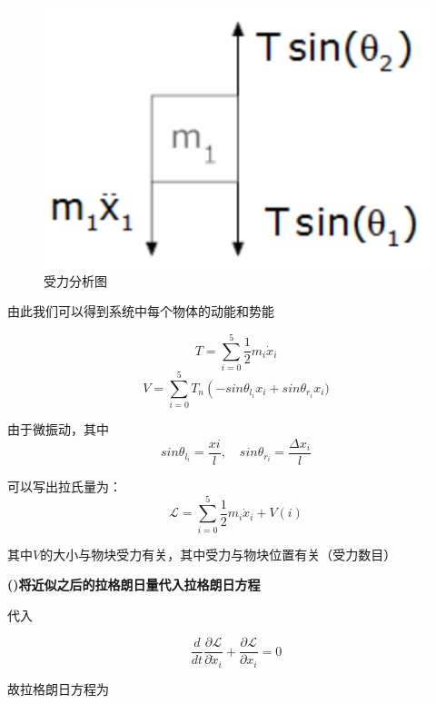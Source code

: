 \documentclass[11pt, a4paper, oneside]{ctexart}
\begin{document}
{\begin{figure}[h]
    \centering
    \vspace{4mm}
    \includegraphics[scale=0.2]{44.png}
    \caption{受力分析图}
\end{figure} 

由此我们可以得到系统中每个物体的动能和势能

\begin{equation}
    T = \sum_{i=0}^5\frac{1}{2}m_i\dot{x}_i
\end{equation}
\begin{equation}
    V = \sum_{i=0}^5T_n\left(-sin\theta_{l_i}x_i+sin\theta_{r_i}x_i\right.)
\end{equation}

由于微振动，其中
\begin{equation}
    sin\theta_{l_i}=\frac{xi}{l},\quad sin\theta_{r_i}=\frac{\Delta x_i}{l}
\end{equation}

可以写出拉氏量为：
\begin{equation}
    \mathscr{L}=\sum_{i=0}^5\frac{1}{2}m_i\dot{x}_i+V(i)
\end{equation}

其中$V$的大小与物块受力有关，其中受力与物块位置有关（受力数目）

\vspace{5mm}
\textbf{()将近似之后的拉格朗日量代入拉格朗日方程}

\vspace{5mm}代入

\begin{equation}
    \frac{d}{dt}\frac{\partial\mathscr{L}}{\partial \dot x_i}
    +\frac{\partial\mathscr{L}}{\partial x_i}
    = 0
\end{equation}

故拉格朗日方程为

}
\end{document}
